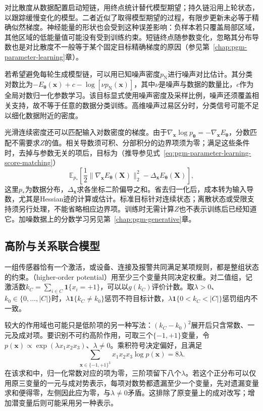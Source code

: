 对比散度从数据配置启动短链，用终点统计替代模型期望；持久链沿用上轮状态，以跟踪缓慢变化的模型。二者近似了取得模型期望的过程，有限步更新未必等于精确似然梯度。神经能量的形状也会受到这种误差影响：负样本若只覆盖局部区域，其他区域的低能量值可能没有受到训练约束。短链终点随参数变化，忽略其分布导数也是对比散度不一般等于某个固定目标精确梯度的原因（参见第~\ref{chap:pgm-parameter-learning}章）。

若希望避免每轮生成模型链，可以用已知噪声密度$p_{\mathrm{N}}$进行噪声对比估计。其分类对数比为$-E_{\bm{\theta}}(\bm{x})+c-\log[\nu p_{\mathrm{N}}(\bm{x})]$，其中$\nu$是噪声与数据的数量比，$c$作为全局对数归一化参数学习。该目标显式使用噪声密度及采样比例，噪声还须覆盖相关支持，故不等于任意的数据分类训练。高维噪声过易区分时，分类信号可能不足以细化数据附近的密度。

光滑连续密度还可以匹配输入对数密度的梯度。由于$\nabla_{\bm{x}}\log p_{\bm{\theta}}=-\nabla_{\bm{x}}E_{\bm{\theta}}$，分数匹配不需要求$Z$的值。相关导数须可积、分部积分的边界项须为零；满足这些条件时，去掉与参数无关的项后，目标为（推导参见式~\eqref{eq:pgm-parameter-learning-score-matching}）
\[
  \mathbb{E}_{p_*}\!\left[
      \frac12\lVert\nabla_{\bm{x}}E_{\bm{\theta}}(\bm{X})\rVert_2^2
      -\Delta_{\bm{x}}E_{\bm{\theta}}(\bm{X})\right],
\]
这里$p_*$为数据分布，$\Delta_{\bm{x}}$求各坐标二阶偏导之和。省去归一化后，成本转为输入导数，尤其是Hessian迹的计算或估计。标准目标针对连续状态；离散状态或受限支持须另行处理，不能省略相应边界项。训练时无需计算$Z$也不表示训练后已经知道它。加噪数据上的分数学习另见第~\ref{chap:pgm-generative}章。

\subsection{高阶与关系联合模型}
\label{sec:pgm-energy-models-higher-relational}

一组传感器恰有一个激活，或设备、连接及报警共同满足某项规则，都是整组状态的约束。（higher-order potential）用至少三个变量共同决定权重。对二值组，记激活数$k_C=\sum_{i\in C}\mathbf{1}\{x_i=+1\}$，可以以$g(k_C)$评价计数。取$\lambda>0$、$k_0\in\{0,\ldots,|C|\}$时，$\lambda\mathbf{1}\{k_C\ne k_0\}$惩罚不符目标计数，$\lambda\mathbf{1}\{0<k_C<|C|\}$惩罚组内不一致。

较大的作用域也可能只是低阶项的另一种写法：$(k_C-k_0)^2$展开后只含常数、一元及成对项。要识别不可约高阶作用，可取三个$\{-1,+1\}$变量，令$p(\bm{x})\propto\exp(\lambda x_1x_2x_3)$、$\lambda\ne0$。乘积符号决定偏好，且满足
\[
  \sum_{\bm{x}\in\{-1,+1\}^3}
     x_1x_2x_3\log p(\bm{x})=8\lambda.
\]
在该求和中，归一化常数对应的项为零，三阶项留下八个$\lambda$。若这个正分布可以仅用原三变量的一元与成对势表示，每项对数势都遗漏至少一个变量，先对遗漏变量求和便得零，左侧因此应为零，与$\lambda\ne0$矛盾。这排除了原变量上的成对改写；增加潜变量后则可能采用另一种表示。

